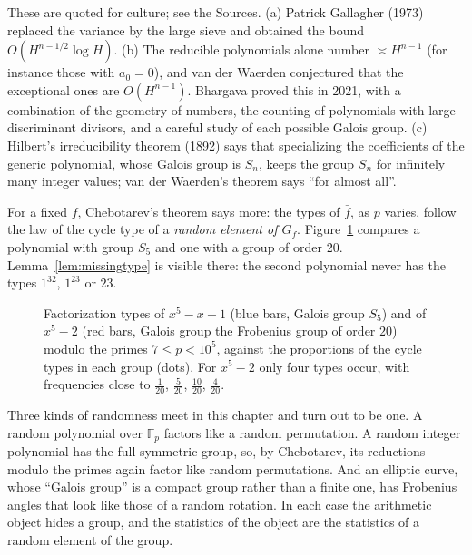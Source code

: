\begin{remark}
These are quoted for culture; see the Sources. (a) Patrick Gallagher (1973) replaced the variance by the large sieve and obtained the bound $O(H^{n-1/2}\log H)$. (b) The reducible polynomials alone number $\asymp H^{n-1}$ (for instance those with $a_0=0$), and van der Waerden conjectured that the exceptional ones are $O(H^{n-1})$. Bhargava proved this in 2021, with a combination of the geometry of numbers, the counting of polynomials with large discriminant divisors, and a careful study of each possible Galois group. (c) Hilbert's irreducibility theorem (1892) says that specializing the coefficients of the generic polynomial, whose Galois group is $S_n$, keeps the group $S_n$ for infinitely many integer values; van der Waerden's theorem says ``for almost all''.
\end{remark}

For a fixed $f$, Chebotarev's theorem says more: the types of $\bar f$, as $p$ varies, follow the law of the cycle type of a \emph{random element of $G_f$}. Figure~\ref{fig:chebotarev} compares a polynomial with group $S_5$ and one with a group of order $20$. Lemma~\ref{lem:missingtype} is visible there: the second polynomial never has the types $1^32$, $1^23$ or $23$.

\begin{figure}[ht]
\centering{}
\caption{Factorization types of $x^5-x-1$ (blue bars, Galois group $S_5$) and of $x^5-2$ (red bars, Galois group the Frobenius group of order $20$) modulo the primes $7\le p<10^5$, against the proportions of the cycle types in each group (dots). For $x^5-2$ only four types occur, with frequencies close to $\frac1{20}$, $\frac5{20}$, $\frac{10}{20}$, $\frac4{20}$.}
\label{fig:chebotarev}
\end{figure}

\begin{beauty}
Three kinds of randomness meet in this chapter and turn out to be one. A random polynomial over $\mathbb F_p$ factors like a random permutation. A random integer polynomial has the full symmetric group, so, by Chebotarev, its reductions modulo the primes again factor like random permutations. And an elliptic curve, whose ``Galois group'' is a compact group rather than a finite one, has Frobenius angles that look like those of a random rotation. In each case the arithmetic object hides a group, and the statistics of the object are the statistics of a random element of the group.
\end{beauty}

